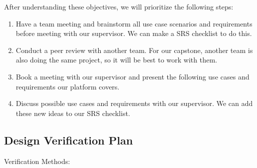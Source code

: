 \documentclass[12pt, titlepage]{article}
\begin{document}
After understanding these objectives, we will prioritize the following steps:
\begin{enumerate}
    \item Have a team meeting and brainstorm all use case scenarios and requirements before meeting with our supervisor. We can make a SRS checklist to do this.
    \item Conduct a peer review with another team. For our capstone, another team is also doing the same project, so it will be best to work with them.
    \item Book a meeting with our supervisor and present the following use cases and requirements our platform covers.
    \item Discuss possible use cases and requirements with our supervisor. We can add these new ideas to our SRS checklist.
    
\end{enumerate}

\subsection{Design Verification Plan}

Verification Methods:
\end{document}
